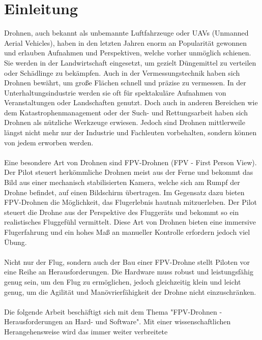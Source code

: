 
\section[Einleitung]{Einleitung}
    Drohnen, auch bekannt als unbemannte Luftfahrzeuge oder UAVs (Unmanned Aerial Vehicles),
    haben in den letzten Jahren enorm an Popularität gewonnen und erlauben Aufnahmen und Perspektiven, welche
    vorher unmöglich schienen. Sie werden in der Landwirtschaft eingesetzt, um gezielt Düngemittel
    zu verteilen oder Schädlinge zu bekämpfen. Auch in der Vermessungstechnik haben sich Drohnen
    bewährt, um große Flächen schnell und präzise zu vermessen\cite{TheSkyistheLimit?}. In der Unterhaltungsindustrie werden
    sie oft für spektakuläre Aufnahmen von Veranstaltungen oder Landschaften genutzt. Doch
    auch in anderen Bereichen wie dem Katastrophenmanagement oder der Such- und Rettungsarbeit
    haben sich Drohnen als nützliche Werkzeuge erwiesen. Jedoch sind Drohnen mittlerweile
    längst nicht mehr nur der Industrie und Fachleuten vorbehalten, sondern können von jedem
    erworben werden.\\ 
    \\
    Eine besondere Art von Drohnen sind FPV-Drohnen (FPV - First Person View). Der Pilot
    steuert herkömmliche Drohnen meist aus der Ferne und bekommt das Bild aus einer mechanisch
    stabilisierten Kamera, welche sich am Rumpf der Drohne befindet, auf einen Bildschirm
    übertragen. Im Gegensatz dazu bieten FPV-Drohnen die Möglichkeit, das Flugerlebnis hautnah
    mitzuerleben. Der Pilot steuert die Drohne aus der Perspektive des Fluggeräts und bekommt
    so ein realistisches Fluggefühl vermittelt. Diese Art von Drohnen bieten eine immersive
    Flugerfahrung und ein hohes Maß an manueller Kontrolle erfordern jedoch viel Übung. \\
    \\
    Nicht nur der Flug, sondern auch der Bau einer FPV-Drohne stellt Piloten vor eine Reihe
    an Herausforderungen. Die Hardware muss robust und leistungsfähig genug sein, um den
    Flug zu ermöglichen, jedoch gleichzeitig klein und leicht genug, um die Agilität und
    Manövrierfähigkeit der Drohne nicht einzuschränken.\\
    \\
    Die folgende Arbeit beschäftigt sich mit dem Thema "FPV-Drohnen - Herausforderungen an Hard- und
    Software". Mit einer wissenschaftlichen Herangehensweise wird das immer weiter verbreitete
